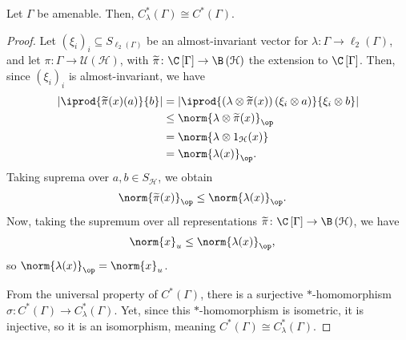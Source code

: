 \documentclass[10pt]{mypackage}
\begin{document}
\begin{theorem}
  Let $\Gamma$ be amenable. Then, $C^{\ast}_{\lambda}\left( \Gamma \right) \cong C^{\ast}\left( \Gamma \right)$.
\end{theorem}
\begin{proof}
  Let $\left( \xi_i \right)_i\subseteq S_{\ell_2\left( \Gamma \right)}$ be an almost-invariant vector for $\lambda\colon \Gamma\rightarrow \ell_2\left( \Gamma \right)$, and let $\pi\colon \Gamma\rightarrow \mathcal{U}\left( \mathcal{H} \right)$, with $\widetilde{\pi}\colon \C\left[ \Gamma \right]\rightarrow \B\left( \mathcal{H} \right)$ the extension to $\C\left[ \Gamma \right]$. Then, since $\left( \xi_i \right)_i$ is almost-invariant, we have
  \begin{align*}
    \left\vert \iprod{\widetilde{\pi}(x)(a)}{b} \right\vert &= \left\vert \iprod{\left( \lambda\otimes \widetilde{\pi}(x) \right)\left( \xi_i\otimes a \right)}{\xi_i\otimes b} \right\vert\\
                                                &\leq \norm{\lambda\otimes \widetilde{\pi}(x)}_{\op}\\
                                                &= \norm{\lambda\otimes 1_{\mathcal{H}}(x)}\\
                                                &= \norm{\lambda(x)}_{\op}.
  \end{align*}
  Taking suprema over $a,b\in S_{\mathcal{H}}$, we obtain
  \begin{align*}
    \norm{\widetilde{\pi}(x)}_{\op} &\leq \norm{\lambda(x)}_{\op}.
  \end{align*}
  Now, taking the supremum over all representations $\widetilde{\pi}\colon \C\left[ \Gamma \right]\rightarrow \B\left( \mathcal{H} \right)$, we have
  \begin{align*}
    \norm{x}_{u} &\leq \norm{\lambda(x)}_{\op},
  \end{align*}
  so $\norm{\lambda(x)}_{\op} = \norm{x}_{u}$.\newline
  
  From the universal property of $C^{\ast}\left( \Gamma \right)$, there is a surjective $\ast$-homomorphism $\sigma\colon C^{\ast}\left( \Gamma \right)\rightarrow C^{\ast}_{\lambda}\left( \Gamma \right)$. Yet, since this $\ast$-homomorphism is isometric, it is injective, so it is an isomorphism, meaning $C^{\ast}\left( \Gamma \right) \cong C^{\ast}_{\lambda}\left( \Gamma \right)$.
\end{proof}
\end{document}
